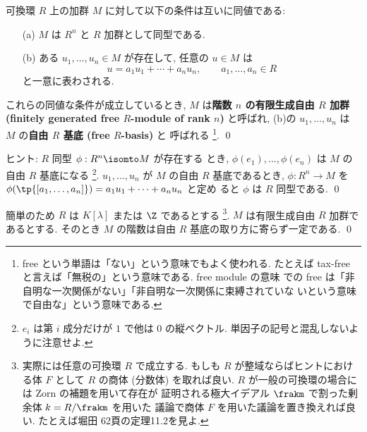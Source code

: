 \documentclass[12pt,twoside]{jarticle}
\begin{document}

\begin{question}[有限生成自由加群]
\label{q:free-mod}
  可換環 $R$ 上の加群 $M$ に対して以下の条件は互いに同値である:
  \begin{itemize}
  \item[(a)] $M$ は $R^n$ と $R$ 加群として同型である.
  \item[(b)] ある $u_1,\dots,u_n\in M$ が存在して, 任意の $u\in M$ は
    \begin{equation*}
      u = a_1 u_1 + \cdots + a_n u_n,
      \qquad
      a_1,\dots,a_n\in R
    \end{equation*}
    と一意に表わされる.
  \end{itemize}
  これらの同値な条件が成立しているとき, $M$ 
  は{\bf 階数 $n$ の有限生成自由 $R$ 加群 
  (finitely generated free $R$-module of rank $n$)} と呼ばれ, 
  (b)の $u_1,\dots,u_n$ は $M$ の{\bf 自由 $R$ 基底 (free $R$-basis)} と
  呼ばれる%
  \footnote{free という単語は「ない」という意味でもよく使われる.
    たとえば tax-free と言えば「無税の」という意味である. free module の意味
    での free は「非自明な一次関係がない」「非自明な一次関係に束縛されていな
    いという意味で自由な」という意味である.}. \qed 
\end{question}

\noindent
ヒント: $R$ 同型 $\phi:R^n\isomto M$ が存在する
とき, $\phi(e_1),\dots,\phi(e_n)$ は $M$ の自由 $R$ 基底になる%
\footnote{$e_i$ は第 $i$ 成分だけが $1$ で他は $0$ の縦ベクトル. 
  単因子の記号と混乱しないように注意せよ.}.
$u_1,\dots,u_n$ が $M$ の自由 $R$ 基底であるとき,
$\phi:R^n\to M$ を $\phi(\tp{[a_1,\dots,a_n]})=a_1u_1+\cdots+a_nu_n$ と定め
ると $\phi$ は $R$ 同型である.
\qed


\begin{question}[階数の一意性]
\label{q:rank-uniquness}
  簡単のため $R$ は $K[\lambda]$ または $\Z$ であるとする%
  \footnote{実際には任意の可換環 $R$ で成立する.
    もしも $R$ が整域ならばヒントにおける体 $F$ として $R$ の商体 (分数体) 
    を取れば良い.  $R$ が一般の可換環の場合には Zorn の補題を用いて存在が
    証明される極大イデアル $\frakm$ で割った剰余体 $k=R/\frakm$ を用いた
    議論で商体 $F$ を用いた議論を置き換えれば良い.
    たとえば堀田 \cite{gun-kagun} 62頁の定理11.2を見よ.}.
  $M$ は有限生成自由 $R$ 加群であるとする.
  そのとき $M$ の階数は自由 $R$ 基底の取り方に寄らず一定である.
  \qed
\end{question}
\end{document}
